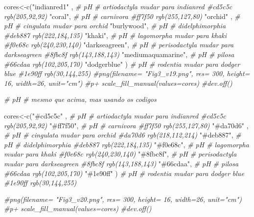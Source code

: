 \documentclass[
]{article}
\newenvironment{Shaded}{\begin{snugshade}}{\end{snugshade}}
\newcommand{\CommentTok}[1]{\textcolor[rgb]{0.56,0.35,0.01}{\textit{#1}}}
\newcommand{\FunctionTok}[1]{\textcolor[rgb]{0.00,0.00,0.00}{#1}}
\newcommand{\NormalTok}[1]{#1}
\newcommand{\OtherTok}[1]{\textcolor[rgb]{0.56,0.35,0.01}{#1}}
\newcommand{\StringTok}[1]{\textcolor[rgb]{0.31,0.60,0.02}{#1}}
\begin{document}
\begin{Shaded}
\begin{Highlighting}[]
\NormalTok{cores}\OtherTok{\textless{}{-}}\FunctionTok{c}\NormalTok{(}\StringTok{"indianred1"}\NormalTok{ , }\CommentTok{\# pH \# artiodactyla mudar para indianred \#cd5c5c rgb(205,92,92)}
    \StringTok{"coral"}\NormalTok{,  }\CommentTok{\# pH \# carnivora \#ff7f50 rgb(255,127,80)}
    \StringTok{"orchid"}\NormalTok{ , }\CommentTok{\# pH \# cingulata mudar para orchid }
    \StringTok{"burlywood"}\NormalTok{, }\CommentTok{\# pH \# didelphimorphia \#deb887 rgb(222,184,135)}
    \StringTok{"khaki"}\NormalTok{, }\CommentTok{\# pH \# lagomorpha mudar para khaki \#f0e68c rgb(240,230,140)}
    \StringTok{"darkseagreen"}\NormalTok{, }\CommentTok{\# pH \#  perisodactyla mudar para darkseagreen \#8fbc8f rgb(143,188,143)}
    \StringTok{"mediumaquamarine"}\NormalTok{, }\CommentTok{\# pH \# pilosa \#66cdaa rgb(102,205,170)   }
    \StringTok{"dodgerblue"}\NormalTok{ ) }\CommentTok{\# pH \#  rodentia mudar para dodger blue \#1e90ff rgb(30,144,255)}
    \CommentTok{\#png(filename= "Fig3\_v19.png", res= 300,  height= 16, width=26, unit="cm")}
    \CommentTok{\#p+ scale\_fill\_manual(values=cores)}
    \CommentTok{\#dev.off()}

\CommentTok{\# pH \#  mesmo que acima, mas usando os codigos}
    
\NormalTok{    cores}\OtherTok{\textless{}{-}}\FunctionTok{c}\NormalTok{(}\StringTok{"\#cd5c5c"}\NormalTok{ , }\CommentTok{\# pH \# artiodactyla mudar para indianred \#cd5c5c rgb(205,92,92)}
             \StringTok{"\#ff7f50"}\NormalTok{,  }\CommentTok{\# pH \# carnivora \#ff7f50 rgb(255,127,80)}
             \StringTok{"\#da70d6"}\NormalTok{ , }\CommentTok{\# pH \# cingulata mudar para orchid \#da70d6 rgb(218,112,214)}
             \StringTok{"\#deb887"}\NormalTok{, }\CommentTok{\# pH \# didelphimorphia \#deb887 rgb(222,184,135)}
             \StringTok{"\#f0e68c"}\NormalTok{, }\CommentTok{\# pH \# lagomorpha mudar para khaki \#f0e68c rgb(240,230,140)}
             \StringTok{"\#8fbc8f"}\NormalTok{, }\CommentTok{\# pH \#  perisodactyla mudar para darkseagreen \#8fbc8f rgb(143,188,143)}
             \StringTok{"\#66cdaa"}\NormalTok{, }\CommentTok{\# pH \# pilosa \#66cdaa rgb(102,205,170)   }
             \StringTok{"\#1e90ff"}\NormalTok{ ) }\CommentTok{\# pH \# rodentia mudar para dodger blue \#1e90ff rgb(30,144,255)}
    
    \CommentTok{\#png(filename= "Fig3\_v20.png", res= 300,  height= 16, width=26, unit="cm")}
    \CommentTok{\#p+ scale\_fill\_manual(values=cores)}
    \CommentTok{\#dev.off()}
\end{Highlighting}
\end{Shaded}
\end{document}
